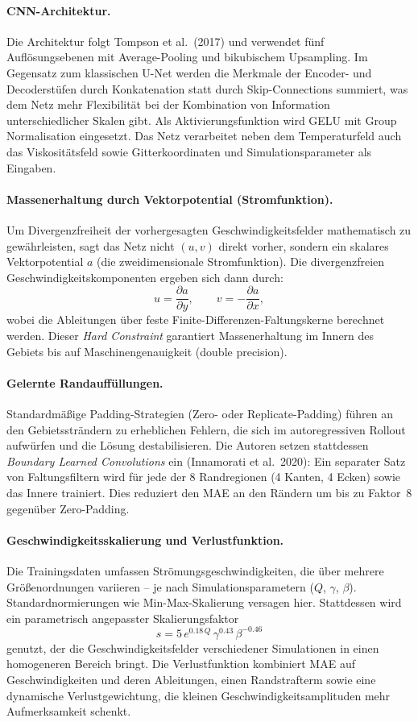 \documentclass[a4paper,12pt]{article}
\begin{document}
\paragraph{CNN-Architektur.}
Die Architektur folgt Tompson et al.\ (2017) und verwendet f\"unf Aufl\"osungsebenen
mit Average-Pooling und bikubischem Upsampling. Im Gegensatz zum klassischen
U-Net werden die Merkmale der Encoder- und Decoderst\"ufen durch
Konkatenation statt durch Skip-Connections summiert, was dem Netz mehr
Flexibilit\"at bei der Kombination von Information unterschiedlicher Skalen
gibt. Als Aktivierungsfunktion wird GELU mit Group Normalisation eingesetzt.
Das Netz verarbeitet neben dem Temperaturfeld auch das Viskosit\"atsfeld sowie
Gitterkoordinaten und Simulationsparameter als Eingaben.

\paragraph{Massenerhaltung durch Vektorpotential (Stromfunktion).}
Um Divergenzfreiheit der vorhergesagten Geschwindigkeitsfelder
mathematisch zu gew\"ahrleisten, sagt das Netz nicht $(u, v)$ direkt
vorher, sondern ein skalares Vektorpotential $a$ (die
zweidimensionale Stromfunktion). Die divergenzfreien Geschwindigkeitskomponenten
ergeben sich dann durch:
\[
  u = \frac{\partial a}{\partial y}, \qquad v = -\frac{\partial a}{\partial x},
\]
wobei die Ableitungen \"uber feste Finite-Differenzen-Faltungskerne berechnet
werden. Dieser \emph{Hard Constraint} garantiert Massenerhaltung im Innern
des Gebiets bis auf Maschinengenauigkeit (double precision).

\paragraph{Gelernte Randauff\"ullungen.}
Standardm\"a{\ss}ige Padding-Strategien (Zero- oder Replicate-Padding) f\"uhren
an den Gebietsstr\"andern zu erheblichen Fehlern, die sich im autoregressiven
Rollout aufw\"urfen und die L\"osung destabilisieren. Die Autoren setzen
stattdessen \emph{Boundary Learned Convolutions} ein (Innamorati et al.\ 2020):
Ein separater Satz von Faltungsfiltern wird f\"ur jede der 8 Randregionen
(4 Kanten, 4 Ecken) sowie das Innere trainiert. Dies reduziert den MAE an
den R\"andern um bis zu Faktor~8 gegen\"uber Zero-Padding.

\paragraph{Geschwindigkeitsskalierung und Verlustfunktion.}
Die Trainingsdaten umfassen Str\"omungsgeschwindigkeiten, die \"uber mehrere
Gr\"o{\ss}enordnungen variieren -- je nach Simulationsparametern ($Q$, $\gamma$,
$\beta$). Standardnormierungen wie Min-Max-Skalierung versagen hier.
Stattdessen wird ein parametrisch angepasster Skalierungsfaktor
\[
  s = 5\,e^{0.18\,Q}\,\gamma^{0.43}\,\beta^{-0.46}
\]
genutzt, der die Geschwindigkeitsfelder verschiedener Simulationen in
einen homogeneren Bereich bringt. Die Verlustfunktion kombiniert MAE
auf Geschwindigkeiten und deren Ableitungen, einen Randstrafterm sowie
eine dynamische Verlustgewichtung, die kleinen Geschwindigkeitsamplituden
mehr Aufmerksamkeit schenkt.
\end{document}
